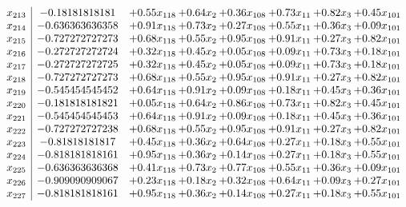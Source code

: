 \documentclass[8pt]{article}
\begin{document}
\[\begin{array}{c| c c@{\hskip 2pt} c@{\hskip 2pt} c@{\hskip 2pt} c@{\hskip 2pt} c@{\hskip 2pt} c@{\hskip 2pt} }
 x_{213}   &  -0.18181818181 & +  0.55 x_{118} & +  0.64 x_{2} & +  0.36 x_{108} & +  0.73 x_{11} & +  0.82 x_{3} & +  0.45 x_{101}\\
 x_{214}   &  -0.636363636358 & +  0.91 x_{118} & +  0.73 x_{2} & +  0.27 x_{108} & +  0.55 x_{11} & +  0.36 x_{3} & +  0.09 x_{101}\\
 x_{215}   &  -0.727272727273 & +  0.68 x_{118} & +  0.55 x_{2} & +  0.95 x_{108} & +  0.91 x_{11} & +  0.27 x_{3} & +  0.82 x_{101}\\
 x_{216}   &  -0.272727272724 & +  0.32 x_{118} & +  0.45 x_{2} & +  0.05 x_{108} & +  0.09 x_{11} & +  0.73 x_{3} & +  0.18 x_{101}\\
 x_{217}   &  -0.272727272725 & +  0.32 x_{118} & +  0.45 x_{2} & +  0.05 x_{108} & +  0.09 x_{11} & +  0.73 x_{3} & +  0.18 x_{101}\\
 x_{218}   &  -0.727272727273 & +  0.68 x_{118} & +  0.55 x_{2} & +  0.95 x_{108} & +  0.91 x_{11} & +  0.27 x_{3} & +  0.82 x_{101}\\
 x_{219}   &  -0.545454545452 & +  0.64 x_{118} & +  0.91 x_{2} & +  0.09 x_{108} & +  0.18 x_{11} & +  0.45 x_{3} & +  0.36 x_{101}\\
 x_{220}   &  -0.181818181821 & +  0.05 x_{118} & +  0.64 x_{2} & +  0.86 x_{108} & +  0.73 x_{11} & +  0.82 x_{3} & +  0.45 x_{101}\\
 x_{221}   &  -0.545454545453 & +  0.64 x_{118} & +  0.91 x_{2} & +  0.09 x_{108} & +  0.18 x_{11} & +  0.45 x_{3} & +  0.36 x_{101}\\
 x_{222}   &  -0.727272727238 & +  0.68 x_{118} & +  0.55 x_{2} & +  0.95 x_{108} & +  0.91 x_{11} & +  0.27 x_{3} & +  0.82 x_{101}\\
 x_{223}   &  -0.81818181817 & +  0.45 x_{118} & +  0.36 x_{2} & +  0.64 x_{108} & +  0.27 x_{11} & +  0.18 x_{3} & +  0.55 x_{101}\\
 x_{224}   &  -0.818181818161 & +  0.95 x_{118} & +  0.36 x_{2} & +  0.14 x_{108} & +  0.27 x_{11} & +  0.18 x_{3} & +  0.55 x_{101}\\
 x_{225}   &  -0.636363636368 & +  0.41 x_{118} & +  0.73 x_{2} & +  0.77 x_{108} & +  0.55 x_{11} & +  0.36 x_{3} & +  0.09 x_{101}\\
 x_{226}   &  -0.909090909067 & +  0.23 x_{118} & +  0.18 x_{2} & +  0.32 x_{108} & +  0.64 x_{11} & +  0.09 x_{3} & +  0.27 x_{101}\\
 x_{227}   &  -0.818181818161 & +  0.95 x_{118} & +  0.36 x_{2} & +  0.14 x_{108} & +  0.27 x_{11} & +  0.18 x_{3} & +  0.55 x_{101}\\

\end{array}\]
\end{document}
